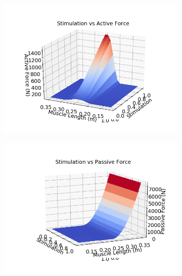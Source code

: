 \documentclass{cmc}
\begin{document}
\begin{figure}[H]
    \begin{subfigure}{.48\textwidth}
        \centering
          \includegraphics[width=\textwidth]{1b/1b._Stim_vs_Active_Force_Surface_Plot.png}
    \label{fig:stimForcea}
    \end{subfigure}    
    \hfill
    \begin{subfigure}{.48\textwidth}
        \centering
          \includegraphics[width=\textwidth]{1b/1b._Stim_vs_Passive_Force_Surface_Plot.png}
    \label{fig:stimForceb}
    \end{subfigure}
\end{figure}
\end{document}
